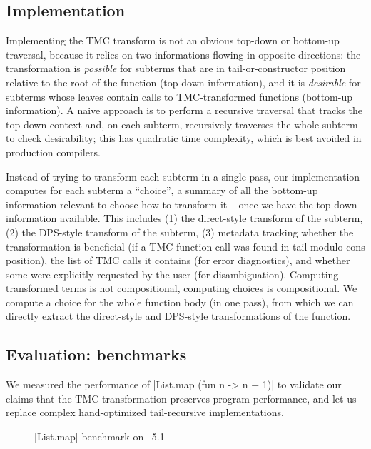 \subsection{Implementation} \label{subsec:implementation} Implementing the TMC transform is not an obvious top-down or bottom-up traversal, because it relies on two informations flowing in opposite directions: the transformation is \emph{possible} for subterms that are in tail-or-constructor position relative to the root of the function (top-down information), and it is \emph{desirable} for subterms whose leaves contain calls to TMC-transformed functions (bottom-up information). A naive approach is to perform a recursive traversal that tracks the top-down context and, on each subterm, recursively traverses the whole subterm to check desirability; this has quadratic time complexity, which is best avoided in production compilers.

Instead of trying to transform each subterm in a single pass, our implementation computes for each subterm a ``choice'', a summary of all the bottom-up information relevant to choose how to transform it -- once we have the top-down information available. This includes (1) the direct-style transform of the subterm, (2) the DPS-style transform of the subterm, (3) metadata tracking whether the transformation is beneficial (if a TMC-function call was found in tail-modulo-cons position), the list of TMC calls it contains (for error diagnostics), and whether some were explicitly requested by the user (for disambiguation). Computing transformed terms is not compositional, computing choices is compositional. We compute a choice for the whole function body (in one pass), from which we can directly extract the direct-style and DPS-style transformations of the function.

\subsection{Evaluation: benchmarks}

We measured the performance of \ocaml|List.map (fun n -> n + 1)| to validate our claims that the TMC transformation preserves program performance, and let us replace complex hand-optimized tail-recursive implementations.

\begin{figure}[tp]
\def\svgscale{0.8}
\graphicspath{{plots/}}

\caption{\ocaml|List.map| benchmark on \OCaml~5.1}
\label{fig:bench5}
\end{figure}

